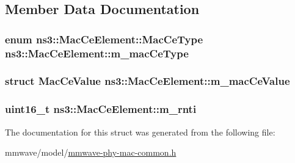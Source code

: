 \subsection{Member Data Documentation}
\subsubsection[{\texorpdfstring{m\+\_\+mac\+Ce\+Type}{m_macCeType}}]{\setlength{\rightskip}{0pt plus 5cm}enum {\bf ns3\+::\+Mac\+Ce\+Element\+::\+Mac\+Ce\+Type}  ns3\+::\+Mac\+Ce\+Element\+::m\+\_\+mac\+Ce\+Type}\hypertarget{structns3_1_1MacCeElement_a92091162005bd551450d753b44a8424f}{}\label{structns3_1_1MacCeElement_a92091162005bd551450d753b44a8424f}
\subsubsection[{\texorpdfstring{m\+\_\+mac\+Ce\+Value}{m_macCeValue}}]{\setlength{\rightskip}{0pt plus 5cm}struct {\bf Mac\+Ce\+Value} ns3\+::\+Mac\+Ce\+Element\+::m\+\_\+mac\+Ce\+Value}\hypertarget{structns3_1_1MacCeElement_a44b4cdfd792ab8ead4100ad6ca587143}{}\label{structns3_1_1MacCeElement_a44b4cdfd792ab8ead4100ad6ca587143}
\subsubsection[{\texorpdfstring{m\+\_\+rnti}{m_rnti}}]{\setlength{\rightskip}{0pt plus 5cm}uint16\+\_\+t ns3\+::\+Mac\+Ce\+Element\+::m\+\_\+rnti}\hypertarget{structns3_1_1MacCeElement_a4f41de3b3f876ecd90a60b31d4cd43c3}{}\label{structns3_1_1MacCeElement_a4f41de3b3f876ecd90a60b31d4cd43c3}


The documentation for this struct was generated from the following file\+:\begin{DoxyCompactItemize}
\item 
mmwave/model/\hyperlink{mmwave-phy-mac-common_8h}{mmwave-\/phy-\/mac-\/common.\+h}\end{DoxyCompactItemize}
